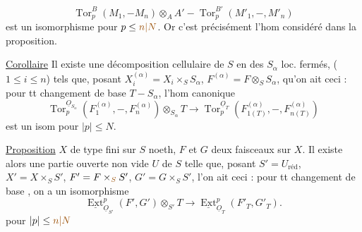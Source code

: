 \[
\operatorname{Tor}_p^B(M_1,-M_n)\otimes_A A'-\operatorname{Tor}_p^{B'}(M'_1,-,M'_n)
\]
est un isomorphisme pour $p\leq\unsure{n|N}$. Or c'est précisément l'hom considéré dans la proposition.

\uline{Corollaire}  Il existe une décomposition cellulaire de $S$ en des $S_\alpha$ loc. fermés, ($1\leq i\leq n$) tels que, posant  $X_i^{(\alpha)}=X_i\times_S S_\alpha$, $F^{(\alpha)}=F\otimes_S S_\alpha$,  qu'on ait ceci : pour tt changement de base $T-S_\alpha$, l'hom canonique
\[
\operatorname{Tor}_p^{\underline O_{S_\alpha}}(F_1^{(\alpha)},-,F_n^{(\alpha)})\otimes_{S_\alpha}T\longrightarrow\operatorname{Tor}_p^{\underline O_T}(F_{1(T)}^{(\alpha)},-,F_{n(T)}^{(\alpha)})
\]
est un isom pour $|p|\leq N$.

\uline{Proposition} $X$ de type fini sur $S$ noeth, $F$ et $G$ deux faisceaux  sur $X$.  Il existe alors une partie ouverte non vide $U$ de $S$ telle que, posant $S'=U_{\text{réd}}$, $X'=X\times_S S'$, $F'=F\times_{\unsure{S}}S'$, $G'=G\times_S S'$, l'on ait ceci : pour tt changement de base , on a un isomorphisme
\[
\underline{\operatorname{Ext}}^p_{\underline O_{S'}}(F',G')\otimes_{S'}T\longrightarrow\underline{\operatorname{Ext}}^p_{\underline O_T}(F'_T,G'_T).
\]
pour $|p|\leq\unsure{n|N}$
